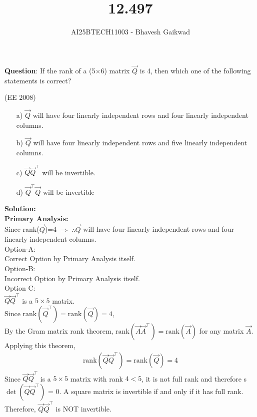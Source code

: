 \documentclass[journal]{IEEEtran}
\begin{document}

\vspace{3cm}

\title{12.497}
\author{AI25BTECH11003 - Bhavesh Gaikwad}
{\let\newpage\relax\maketitle}

\renewcommand{\thefigure}{\theenumi}
\renewcommand{\thetable}{\theenumi}
\setlength{\intextsep}{10pt} 

\renewcommand{\thetable}{\theenumi}


\textbf{Question}: If the rank of a (5$\times$6) matrix $\vec{Q}$ is 4, then which one of the following statements is correct?

\hfill{(EE 2008)}

\begin{itemize}
    \item[a)]$\vec{Q}$ will have four linearly independent rows and four linearly independent columns.
    \item[b)]$\vec{Q}$ will have four linearly independent rows and five linearly independent columns.
    \item[c)]$\vec{Q}\vec{Q}^\top$ will be invertible.
    \item[d)]$\vec{Q}^\top\vec{Q}$ will be invertible 
\end{itemize}

\bigskip
 
\textbf{Solution:}\\

\textbf{Primary Analysis:}\\
Since rank($\vec{Q}$)=4 $\Rightarrow \; \therefore \vec{Q}$ will have four linearly independent rows and four linearly independent columns.\\

Option-A:\\
Correct Option by Primary Analysis itself.\\

Option-B:\\
Incorrect Option by Primary Analysis itself.\\

Option C:\\
$\vec{Q}\vec{Q}^\top$ is a $5 \times 5$ matrix.\\
Since $\text{rank}(\vec{Q}^\top) = \text{rank}(\vec{Q}) = 4$,\\
By the Gram matrix rank theorem, $\text{rank}(\vec{A}\vec{A}^\top) = \text{rank}(\vec{A})$ for any matrix $\vec{A}$.\\
Applying this theorem,
\begin{align}
\text{rank}(\vec{Q}\vec{Q}^\top) = \text{rank}(\vec{Q}) = 4
\end{align}
Since $\vec{Q}\vec{Q}^\top$ is a $5 \times 5$ matrix with rank $4 < 5$, it is not full rank and therefore s$\det{(\vec{Q}\vec{Q}^\top)}$ = 0. A square matrix is invertible if and only if it has full rank. Therefore, $\vec{Q}\vec{Q}^\top$ is NOT invertible.
\end{document}
